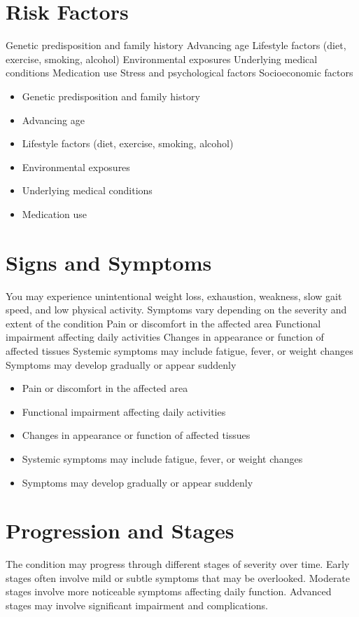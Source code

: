 \section{Risk Factors}
Genetic predisposition and family history Advancing age Lifestyle factors (diet, exercise, smoking, alcohol) Environmental exposures Underlying medical conditions Medication use Stress and psychological factors Socioeconomic factors

\begin{itemize}[noitemsep]
  \item Genetic predisposition and family history
  \item Advancing age
  \item Lifestyle factors (diet, exercise, smoking, alcohol)
  \item Environmental exposures
  \item Underlying medical conditions
  \item Medication use
\end{itemize}
\section{Signs and Symptoms}
You may experience unintentional weight loss, exhaustion, weakness, slow gait speed, and low physical activity. Symptoms vary depending on the severity and extent of the condition Pain or discomfort in the affected area Functional impairment affecting daily activities Changes in appearance or function of affected tissues Systemic symptoms may include fatigue, fever, or weight changes Symptoms may develop gradually or appear suddenly

\begin{itemize}[noitemsep]
  \item Pain or discomfort in the affected area
  \item Functional impairment affecting daily activities
  \item Changes in appearance or function of affected tissues
  \item Systemic symptoms may include fatigue, fever, or weight changes
  \item Symptoms may develop gradually or appear suddenly
\end{itemize}
\section{Progression and Stages}
The condition may progress through different stages of severity over time. Early stages often involve mild or subtle symptoms that may be overlooked. Moderate stages involve more noticeable symptoms affecting daily function. Advanced stages may involve significant impairment and complications.


